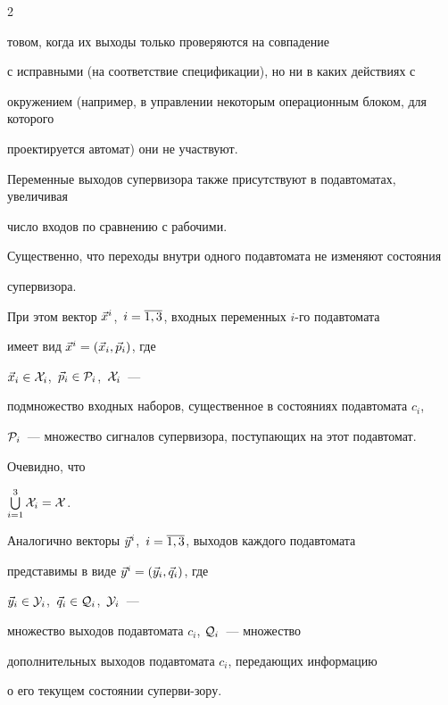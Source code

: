 \begin{multicols}{2}
\bigskip


\medskip




\addtocounter{figure}{1}








\noindent


то\-вом, когда их выходы только проверяются на совпадение


с исправными (на соответствие спецификации), но ни в каких действиях с


окружением (например, в управлении некоторым операционным блоком, для которого


проектируется автомат) они не участвуют.





Переменные выходов супервизора также присутствуют в подавтоматах, увеличивая


число входов по сравнению с рабочими.


Существенно, что переходы внутри одного подавтомата не изменяют состояния


супервизора.


При этом вектор $\vec x^i$,\ $i=\overline{1,3}$, входных переменных $i$-го подавтомата


имеет вид $\vec x^i=(\vec x_i,\vec p_i)$, где


$\vec x_i \in {\cal X}_i$,\ $\vec p_i \in {\cal P}_i$,\ ${\cal X}_i$~---


подмножество входных наборов, существенное в состояниях подавтомата $c_i$,


${\cal P}_i$~--- множество сигналов супервизора, поступающих на этот подавтомат.


Очевидно, что


$\bigcup\limits_{i=1}^3 {\cal X}_i = {\cal X}$.


Аналогично векторы $\vec y^i$,\ $i=\overline{1,3}$, выходов каждого подавтомата


представимы в виде $\vec y^i=(\vec y_i,\vec q_i)$, где


$\vec y_i \in {\cal Y}_i$,\ $\vec q_i \in {\cal Q}_i$,\ ${\cal Y}_i$~---


множество выходов подавтомата $c_i$, ${\cal Q}_i$~--- множество


дополнительных выходов подавтомата $c_i$, передающих информацию


о его текущем состоянии супер\-ви-\linebreak зору.









\end{multicols}
